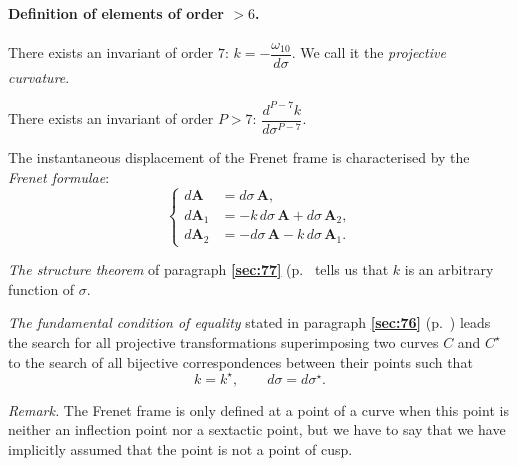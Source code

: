 \documentclass[leqno,11pt]{book}
\numberwithin{equation}{chapter}
\theoremstyle{shape1}
\theoremstyle{shapesmall}
\newcommand{\fsref}[1]{{\rm\textsection\textbf{\ref{sec:#1}}}}
\newcommand{\str}{^{\star}}
\begin{document}
\paragraph{Definition of elements of order $>6$.}
\label{sec:149}
There exists an invariant of order $7$: $k=-\dfrac{\omega_{10}}{d\sigma}$. We call it the \emph{projective curvature}.

There exists an invariant of order $P>7$: $\dfrac{d^{P-7}k}{d\sigma^{P-7}}$.

The instantaneous displacement of the Frenet frame is characterised by the \emph{Frenet formulae}:
\begin{equation}
  \label{eq:10.3.16}
  \left\{
    \begin{aligned}
      d\mathbf{A}_{\phantom{0}}&=d\sigma\,\mathbf{A},\\
      d\mathbf{A}_{1}&=-k\,d\sigma\,\mathbf{A}+d\sigma\,\mathbf{A}_{2},\\      
      d\mathbf{A}_{2}&=-d\sigma\,\mathbf{A}-k\,d\sigma\,\mathbf{A}_{1}.
    \end{aligned}
  \right.
\end{equation}

\emph{The structure theorem} of paragraph \fsref{77} (p.~\pageref{sec:77} tells us that $k$ is an arbitrary function of $\sigma$.

\emph{The fundamental condition of equality} stated in paragraph \fsref{76} (p.~\pageref{sec:76}) leads the search for all projective transformations superimposing two curves $C$ and $C\str$ to the search of all bijective correspondences between their points such that
\[
k=k\str,\qquad d\sigma=d\sigma\str.
\]

\emph{Remark.} The Frenet frame is only defined at a point of a curve when this point is neither an inflection point nor a sextactic point, but we have to say that we have implicitly assumed that the point is not a point of cusp.
\end{document}
